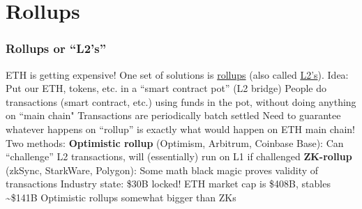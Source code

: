 \documentclass[aspectratio=169]{beamer}
\begin{document}
\section{Rollups}

\begin{frame}
\frametitle{Rollups or ``L2's''}

ETH is getting expensive! One set of solutions is \ul{rollups} (also called \ul{L2's}). Idea:
\bi
\m Put our ETH, tokens, etc. in a ``smart contract pot'' (L2 bridge)
\m People do transactions (smart contract, etc.) using funds in the pot, without doing anything on ``main chain"
\m Transactions are periodically batch settled \pause
\m Need to guarantee whatever happens on ``rollup'' is exactly what would happen on ETH main chain! Two methods:
\bi
\m \textbf{Optimistic rollup} (Optimism, Arbitrum, Coinbase Base): Can ``challenge'' L2 transactions, will (essentially) run on L1 if challenged
\m \textbf{ZK-rollup} (zkSync, StarkWare, Polygon): Some math black magic proves validity of transactions
\ei \pause
\m Industry state: 
\bi
\m \$30B locked! ETH market cap is \$408B, stables \textasciitilde\$141B
\m Optimistic rollups somewhat bigger than ZKs
\ei
\ei

\end{frame}
\end{document}
